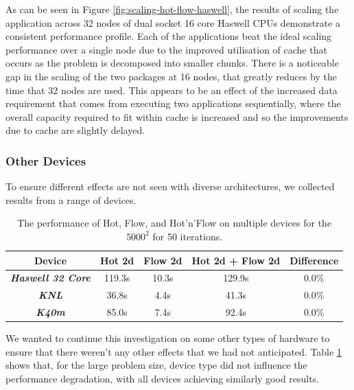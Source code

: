 \documentclass[runningheads,a4paper]{llncs}
\begin{document}
As can be seen in Figure \ref{fig:scaling-hot-flow-haswell}, the results of scaling the application across 32 nodes of dual socket 16 core Haswell CPUs demonstrate a consistent performance profile. Each of the applications beat the ideal scaling performance over a single node due to the improved utilisation of cache that occurs as the problem is decomposed into smaller chunks. There is a noticeable gap in the scaling of the two packages at 16 nodes, that greatly reduces by the time that 32 nodes are used. This appears to be an effect of the increased data requirement that comes from executing two applications sequentially, where the overall capacity required to fit within cache is increased and so the improvements due to cache are slightly delayed.

\subsubsection{Other Devices}

To ensure different effects are not seen with diverse architectures, we collected results from a range of devices.

\begin{table}[h]
  \begin{center}
    \begin{tabular}{c|c|c|c|c}
      \hline
      \textbf{Device} & \textbf{Hot 2d} & \textbf{Flow 2d} & \textbf{Hot 2d + Flow 2d} & \textbf{Difference} \\
      \hline
      \textit{\textbf{Haswell 32 Core}} & 119.3s & 10.3s & 129.9s & 0.0\% \\
      \textit{\textbf{KNL}} & 36.8s & 4.4s & 41.3s & 0.0\% \\
      \textit{\textbf{K40m}} & 85.0s & 7.4s & 92.4s & 0.0\% \\
    \end{tabular}
  \end{center}
  \caption{The performance of Hot, Flow, and Hot'n'Flow on multiple devices for the $5000^2$ for 50 iterations.}
  \label{tab:hot-flow-multi-device}
\end{table}

We wanted to continue this investigation on some other types of hardware to ensure that there weren't any other effects that we had not anticipated. Table \ref{tab:hot-flow-multi-device} shows that, for the large problem size, device type did not influence the performance degradation, with all devices achieving similarly good results. 
\end{document}
